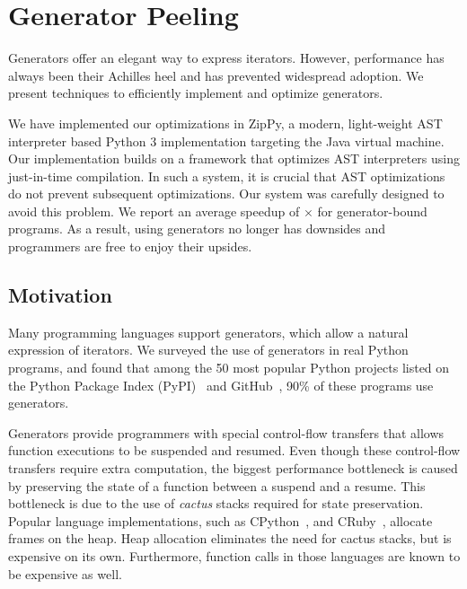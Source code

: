 \chapter{Generator Peeling}
\label{chp:ch5-peeling}

Generators offer an elegant way to express iterators.
However, performance has always been their Achilles heel and has prevented widespread adoption.
We present techniques to efficiently implement and optimize generators.

We have implemented our optimizations in ZipPy, a modern, light-weight AST interpreter based Python 3 implementation targeting the Java virtual machine.
Our implementation builds on a framework that optimizes AST interpreters using just-in-time compilation.
In such a system, it is crucial that AST optimizations do not prevent subsequent optimizations.
Our system was carefully designed to avoid this problem.
We report an average speedup of \peelingSpeedup{}$\times$ for generator-bound programs.
As a result, using generators no longer has downsides and programmers are free to enjoy their upsides.

\section{Motivation}

Many programming languages support generators, which allow a natural expression of iterators.
We surveyed the use of generators in real Python programs, and found that among the 50 most popular Python projects
listed on the Python Package Index (PyPI)~\cite{pypi} and GitHub~\cite{github}, 90\% of these programs use generators.

Generators provide programmers with special control-flow transfers that allows function executions to be suspended and resumed.
Even though these control-flow transfers require extra computation, the biggest performance bottleneck is caused by preserving the state of a function between a suspend and a resume.
This bottleneck is due to the use of \emph{cactus} stacks required for state preservation.
Popular language implementations, such as CPython~\cite{python}, and CRuby~\cite{ruby}, allocate frames on the heap.
Heap allocation eliminates the need for cactus stacks, but is expensive on its own.
Furthermore, function calls in those languages are known to be expensive as well.

